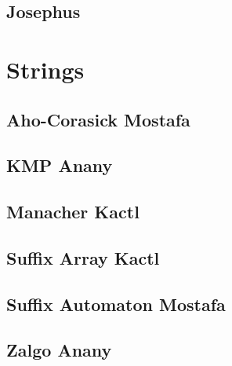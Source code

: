 \subsection{Josephus}
\vspace{-2ex}
\raggedbottom
\vspace{-3.2ex}
\hrulefill

\section{Strings}
\subsection{Aho-Corasick Mostafa}
\vspace{-2ex}
\raggedbottom
\vspace{-3.2ex}
\hrulefill
\subsection{KMP Anany}
\vspace{-2ex}
\raggedbottom
\vspace{-3.2ex}
\hrulefill
\subsection{Manacher Kactl}
\vspace{-2ex}
\raggedbottom
\vspace{-3.2ex}
\hrulefill
\subsection{Suffix Array Kactl}
\vspace{-2ex}
\raggedbottom
\vspace{-3.2ex}
\hrulefill
\subsection{Suffix Automaton Mostafa}
\vspace{-2ex}
\raggedbottom
\vspace{-3.2ex}
\hrulefill
\subsection{Zalgo Anany}
\vspace{-2ex}
\raggedbottom
\vspace{-3.2ex}
\hrulefill
